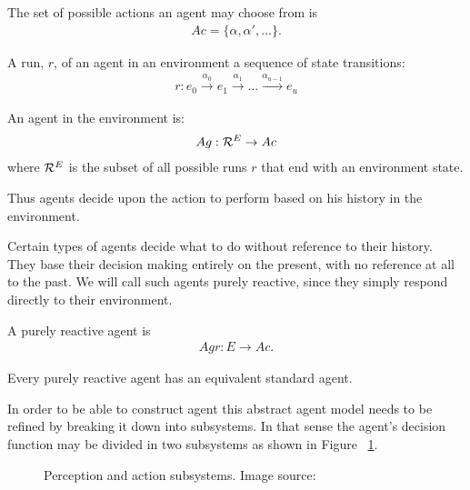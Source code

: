 The set of possible actions an agent may choose from is
\begin{align}
	Ac=\{ \alpha , \alpha ', \ldots\}.
\end{align}

\begin{definition}
A run, $r$, of an agent in an environment a sequence of state transitions:
\begin{align}
	r: e_{0} \xrightarrow{\alpha _{0}} e_{1} \xrightarrow{\alpha _{1}} \ldots \xrightarrow{\alpha _{u-1}} e_{u} 
\end{align}
\end{definition}

\begin{definition}
An agent in the environment is:
\begin{align}
	Ag: \mathcal R ^{E} \rightarrow Ac
\end{align}
where 	$\mathcal R^{E}$ is the subset of all possible runs $r$ that end with an environment state.
\end{definition}

Thus agents decide upon the action to perform based on his history in the environment.

Certain types of agents decide what to do without reference to their history. They base their decision making entirely on the present, with no reference at all to the past. We will call such agents purely reactive, since they simply respond directly to their environment. 

\begin{definition}
A purely reactive agent is
\begin{align}
Agr: E \rightarrow Ac.
\end{align}
\end{definition}

\begin{remark}
Every purely reactive agent has an equivalent standard agent.
\end{remark}


In order to be able to construct agent this abstract agent model needs to be refined by breaking it down into subsystems. In that sense the agent's decision function may be divided in two subsystems as shown in Figure ~\ref{fig:agentperception}.

\begin{figure}[h!]
\centerline{}
      \caption[Agent perception and action]{Perception and action subsystems. Image source: \cite{Wooldridge09AnIntroduction}}
\label{fig:agentperception}
\end{figure}


